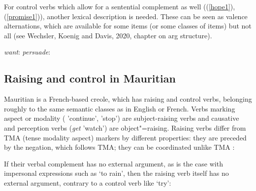 \documentclass[output=paper
	        ,collection
	        ,collectionchapter
 	        ,biblatex
                ,babelshorthands
                ,newtxmath
                ,draftmode
                ,colorlinks, citecolor=brown
]{langscibook}
\begin{document}
For control verbs which allow for a sentential complement as well  ((\ref{hope1}), (\ref{promise1})), another lexical description is needed. These can be seen as valence alternations, which are available for some items (or some classes of items) but not all (see Wechsler, Koenig and Davis, 2020, chapter on arg structure).

\eal
\ex \emph{want}: 
\ex \emph{persuade}: 
\zl




\subsection{Raising and control in Mauritian} \label{sec-maurit}


Mauritian is a French-based creole, which has raising and control verbs, belonging roughly to the same semantic classes as in English or French. Verbs marking aspect or
modality ( 'continue',  'stop') are subject-raising verbs and causative and perception verbs (\emph{get} 'watch') are
object"=raising. Raising verbs differ from TMA (tense modality aspect) markers by different properties: they are preceded by
the negation, which follows TMA; they can be coordinated unlike TMA \citep[]{HenriandLaurens2011}:

\eal
{}
\zl
 
If their verbal complement has no external argument, as is the case with impersonal expressions such as  `to rain', then the raising verb itself has no external argument, contrary to a control verb like  `try':

\eal
{}
\zl
\end{document}
